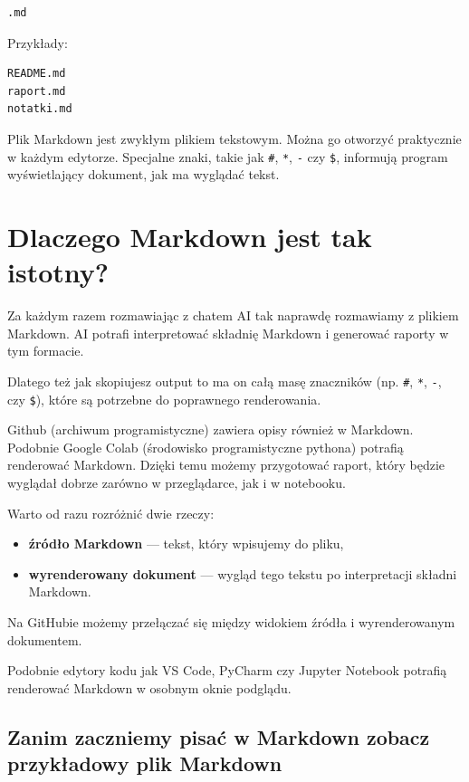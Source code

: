 \documentclass[11pt, a4paper]{article}
\begin{document}
\begin{verbatim}
.md
\end{verbatim}

Przykłady:

\begin{verbatim}
README.md
raport.md
notatki.md
\end{verbatim}

Plik Markdown jest zwykłym plikiem tekstowym. Można go otworzyć praktycznie w każdym edytorze. Specjalne znaki, takie jak \texttt{\#}, \texttt{*}, \texttt{-} czy \texttt{\$}, informują program wyświetlający dokument, jak ma wyglądać tekst.

\section{Dlaczego Markdown jest tak istotny?}

Za każdym razem rozmawiając z chatem AI tak naprawdę rozmawiamy z plikiem Markdown. AI potrafi interpretować składnię Markdown i generować raporty w tym formacie.

Dlatego też jak skopiujesz output to ma on całą masę znaczników (np. \texttt{\#}, \texttt{*}, \texttt{-}, czy \texttt{\$}), które są potrzebne do poprawnego renderowania.

Github (archiwum programistyczne) zawiera opisy również w Markdown. Podobnie Google Colab (środowisko programistyczne pythona) potrafią renderować Markdown. Dzięki temu możemy przygotować raport, który będzie wyglądał dobrze zarówno w przeglądarce, jak i w notebooku.

Warto od razu rozróżnić dwie rzeczy:

\begin{itemize}
    \item \textbf{źródło Markdown} --- tekst, który wpisujemy do pliku,
    \item \textbf{wyrenderowany dokument} --- wygląd tego tekstu po interpretacji składni Markdown.
\end{itemize}

Na GitHubie możemy przełączać się między widokiem źródła i wyrenderowanym dokumentem.

Podobnie edytory kodu jak VS Code, PyCharm czy Jupyter Notebook potrafią renderować Markdown w osobnym oknie podglądu.

\subsection{Zanim zaczniemy pisać w Markdown zobacz przykładowy plik Markdown}
\end{document}
